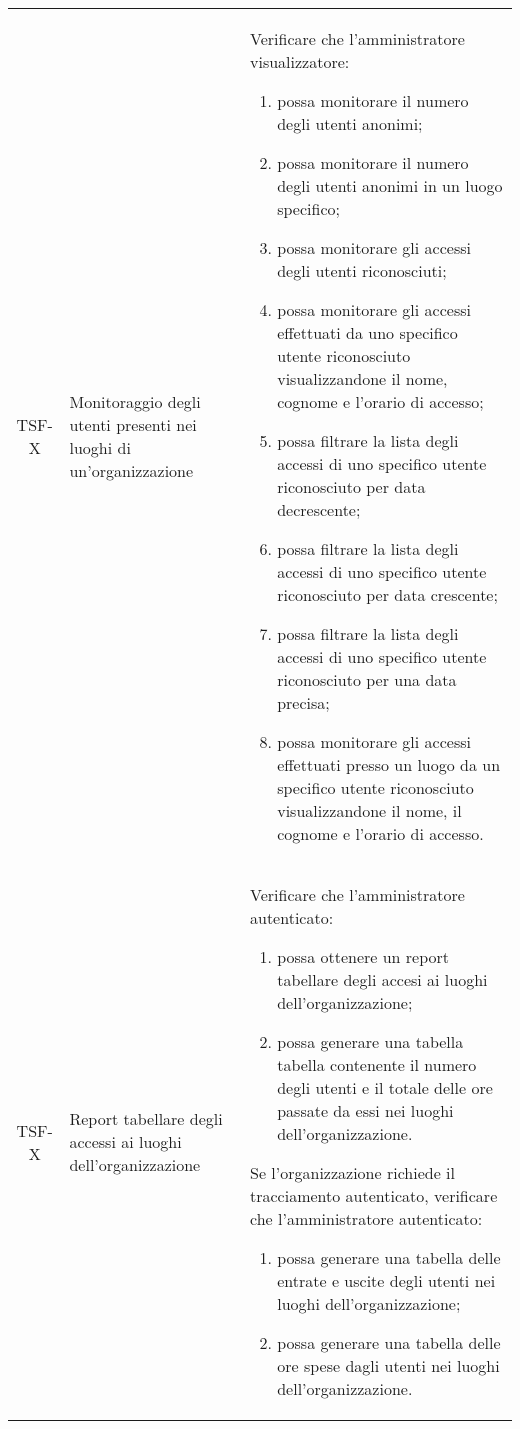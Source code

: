 {\begin{longtable}{ c | C{3cm} | C{11cm} }
TSF-X & Monitoraggio degli utenti presenti nei luoghi di un'organizzazione &
Verificare che l'amministratore visualizzatore:
\begin{enumerate}
    \item possa monitorare il numero degli utenti anonimi;
    \item possa monitorare il numero degli utenti anonimi in un luogo specifico;
    \item possa monitorare gli accessi degli utenti riconosciuti;
    \item possa monitorare gli accessi effettuati da uno specifico utente riconosciuto visualizzandone il nome, cognome e l'orario di accesso;
    \item possa filtrare la lista degli accessi di uno specifico utente riconosciuto per data decrescente;
    \item possa filtrare la lista degli accessi di uno specifico utente riconosciuto per data crescente;
    \item possa filtrare la lista degli accessi di uno specifico utente riconosciuto per una data precisa;
    \item possa monitorare gli accessi effettuati presso un luogo da un specifico utente riconosciuto visualizzandone il nome, il cognome e l’orario di accesso.
\end{enumerate} \\

TSF-X & Report tabellare degli accessi ai luoghi dell'organizzazione &
Verificare che l'amministratore autenticato:
\begin{enumerate}
    \item possa ottenere un report tabellare degli accesi ai luoghi dell'organizzazione;
    \item possa generare una tabella tabella contenente il numero degli utenti e il totale delle ore passate da essi nei luoghi dell’organizzazione.
\end{enumerate}
Se l'organizzazione richiede il tracciamento autenticato, verificare che l'amministratore autenticato:
\begin{enumerate}
    \item possa generare una tabella delle entrate e uscite degli utenti nei luoghi dell'organizzazione;
    \item possa generare una tabella delle ore spese dagli utenti nei luoghi dell'organizzazione.
\end{enumerate} \\


\end{longtable}}

